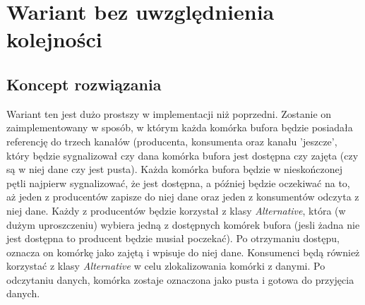 \documentclass[12pt]{article}
\begin{document}
\section{Wariant bez uwzględnienia kolejności}
\subsection{Koncept rozwiązania}
Wariant ten jest dużo prostszy w implementacji niż poprzedni. Zostanie on zaimplementowany w sposób, w którym każda komórka bufora będzie posiadała referencję do trzech kanałów (producenta, konsumenta oraz kanału 'jeszcze', który będzie sygnalizował czy dana komórka bufora jest dostępna czy zajęta (czy są w niej dane czy jest pusta). Każda komórka bufora będzie w nieskończonej pętli najpierw sygnalizować, że jest dostępna, a później będzie oczekiwać na to, aż jeden z producentów zapisze do niej dane oraz jeden z konsumentów odczyta z niej dane. Każdy z producentów będzie korzystał z klasy \emph{Alternative}, która (w dużym uproszczeniu) wybiera jedną z dostępnych komórek bufora (jesli żadna nie jest dostępna to producent będzie musiał poczekać). Po otrzymaniu dostępu, oznacza on komórkę jako zajętą i wpisuje do niej dane. Konsumenci będą również korzystać z klasy \emph{Alternative} w celu zlokalizowania komórki z danymi. Po odczytaniu danych, komórka zostaje oznaczona jako pusta i gotowa do przyjęcia danych.
\end{document}
